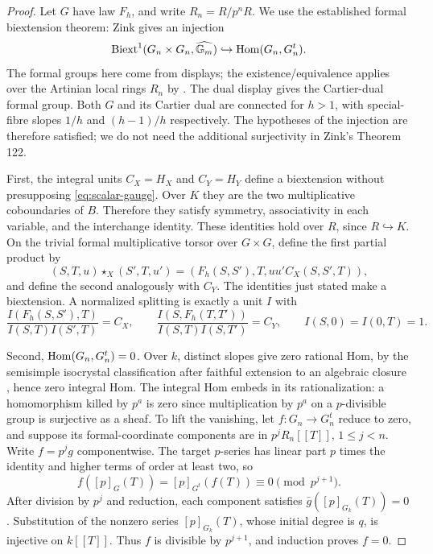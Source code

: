 \documentclass[11pt,a4paper]{article}
\theoremstyle{definition}\newtheorem{remark}[theorem]{Remark}
\begin{document}
\begin{proof}
Let $G$ have law $F_h$, and write $R_n=R/p^nR$. We use the established formal biextension theorem: Zink \cite[\S4.4, Proposition 121 and (243), pp.~241, 246]{Zink} gives an injection
\[
 \operatorname{Biext}^1(G_n\times G_n,\widehat{\mathbb G_m})
 \hookrightarrow\operatorname{Hom}(G_n,G_n^t).
\]
The formal groups here come from displays; the existence/equivalence applies over the Artinian local rings $R_n$ by \cite[Theorem 9, or Theorem 103]{Zink}. The dual display gives the Cartier-dual formal group. Both $G$ and its Cartier dual are connected for $h>1$, with special-fibre slopes $1/h$ and $(h-1)/h$ respectively. The hypotheses of the injection are therefore satisfied; we do not need the additional surjectivity in Zink's Theorem 122.

First, the integral units $C_X=H_X$ and $C_Y=H_Y$ define a biextension without presupposing \eqref{eq:scalar-gauge}. Over $K$ they are the two multiplicative coboundaries of $B$. Therefore they satisfy symmetry, associativity in each variable, and the interchange identity. These identities hold over $R$, since $R\hookrightarrow K$. On the trivial formal multiplicative torsor over $G\times G$, define the first partial product by
\[
 (S,T,u)\star_X(S',T,u')
  =(F_h(S,S'),T,uu'C_X(S,S',T)),
\]
and define the second analogously with $C_Y$. The identities just stated make a biextension. A normalized splitting is exactly a unit $I$ with
\begin{equation}\label{eq:gauge-split}
 \frac{I(F_h(S,S'),T)}{I(S,T)I(S',T)}=C_X,\qquad
 \frac{I(S,F_h(T,T'))}{I(S,T)I(S,T')}=C_Y,
 \qquad I(S,0)=I(0,T)=1.
\end{equation}

Second, $\operatorname{Hom}(G_n,G_n^t)=0$. Over $k$, distinct slopes give zero rational Hom, by the semisimple isocrystal classification after faithful extension to an algebraic closure \cite[\S1.3, first paragraph of p.~120]{Katz79}, hence zero integral Hom. The integral Hom embeds in its rationalization: a homomorphism killed by $p^a$ is zero since multiplication by $p^a$ on a $p$-divisible group is surjective as a sheaf. To lift the vanishing, let $f:G_n\to G_n^t$ reduce to zero, and suppose its formal-coordinate components are in $p^jR_n[[T]]$, $1\le j<n$. Write $f=p^jg$ componentwise. The target $p$-series has linear part $p$ times the identity and higher terms of order at least two, so
\[
 f([p]_G(T))=[p]_{G^t}(f(T))\equiv0\pmod {p^{j+1}}.
\]
After division by $p^j$ and reduction, each component satisfies $\bar g([p]_{G_k}(T))=0$. Substitution of the nonzero series $[p]_{G_k}(T)$, whose initial degree is $q$, is injective on $k[[T]]$. Thus $f$ is divisible by $p^{j+1}$, and induction proves $f=0$.


\end{proof}
\end{document}
